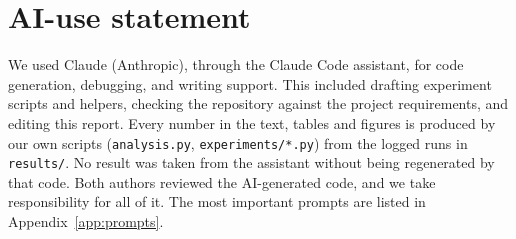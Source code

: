 \section*{AI-use statement}
We used Claude (Anthropic), through the Claude Code assistant, for code generation, debugging, and
writing support. This included drafting experiment scripts and helpers, checking the repository against
the project requirements, and editing this report. Every number in the text, tables and figures is produced
by our own scripts (\texttt{analysis.py}, \texttt{experiments/*.py}) from the logged runs in
\texttt{results/}. No result was taken from the assistant without being regenerated by that code. Both authors reviewed the AI-generated code, and
we take responsibility for all of it. The most important prompts are listed in Appendix~\ref{app:prompts}.

